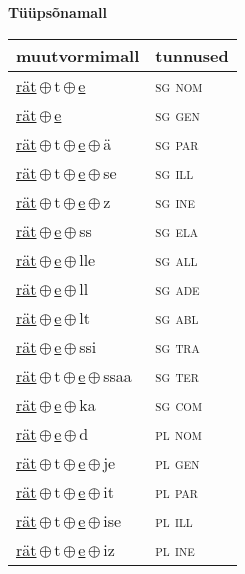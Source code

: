 

\vspace{3.5em}
\noindent \begin{minipage}{\textwidth}
\noindent \textbf{Tüüpsõnamall \,}\\

\begin{sideways}
\begin{tabular}{l l}
muutvormimall & tunnused \\
\hline
\underline{rät}\,$\oplus$\,t\,$\oplus$\,\underline{e} & \textsc{ sg nom } \\
\underline{rät}\,$\oplus$\,\underline{e} & \textsc{ sg gen } \\
\underline{rät}\,$\oplus$\,t\,$\oplus$\,\underline{e}\,$\oplus$\,ä & \textsc{ sg par } \\
\underline{rät}\,$\oplus$\,t\,$\oplus$\,\underline{e}\,$\oplus$\,se & \textsc{ sg ill } \\
\underline{rät}\,$\oplus$\,t\,$\oplus$\,\underline{e}\,$\oplus$\,z & \textsc{ sg ine } \\
\underline{rät}\,$\oplus$\,\underline{e}\,$\oplus$\,ss & \textsc{ sg ela } \\
\underline{rät}\,$\oplus$\,\underline{e}\,$\oplus$\,lle & \textsc{ sg all } \\
\underline{rät}\,$\oplus$\,\underline{e}\,$\oplus$\,ll & \textsc{ sg ade } \\
\underline{rät}\,$\oplus$\,\underline{e}\,$\oplus$\,lt & \textsc{ sg abl } \\
\underline{rät}\,$\oplus$\,\underline{e}\,$\oplus$\,ssi & \textsc{ sg tra } \\
\underline{rät}\,$\oplus$\,t\,$\oplus$\,\underline{e}\,$\oplus$\,ssaa & \textsc{ sg ter } \\
\underline{rät}\,$\oplus$\,\underline{e}\,$\oplus$\,ka & \textsc{ sg com } \\
\underline{rät}\,$\oplus$\,\underline{e}\,$\oplus$\,d & \textsc{ pl nom } \\
\underline{rät}\,$\oplus$\,t\,$\oplus$\,\underline{e}\,$\oplus$\,je & \textsc{ pl gen } \\
\underline{rät}\,$\oplus$\,t\,$\oplus$\,\underline{e}\,$\oplus$\,it & \textsc{ pl par } \\
\underline{rät}\,$\oplus$\,t\,$\oplus$\,\underline{e}\,$\oplus$\,ise & \textsc{ pl ill } \\
\underline{rät}\,$\oplus$\,t\,$\oplus$\,\underline{e}\,$\oplus$\,iz & \textsc{ pl ine } \\

\end{tabular}
\end{sideways}
\end{minipage}
